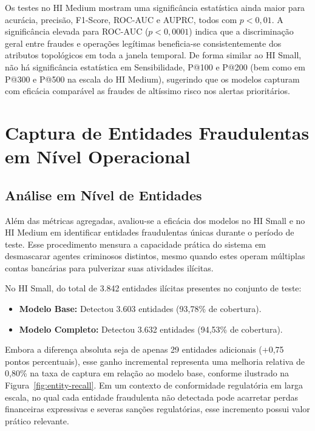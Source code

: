 \documentclass[titlepage,a4paper,oneside,onecolumn,12pt]{report}
\begin{document}
Os testes no HI Medium mostram uma significância estatística ainda maior para acurácia, precisão, F1-Score, ROC-AUC e AUPRC, todos com $p < 0{,}01$. A significância elevada para ROC-AUC ($p < 0{,}0001$) indica que a discriminação geral entre fraudes e operações legítimas beneficia-se consistentemente dos atributos topológicos em toda a janela temporal. De forma similar ao HI Small, não há significância estatística em Sensibilidade, P@100 e P@200 (bem como em P@300 e P@500 na escala do HI Medium), sugerindo que os modelos capturam com eficácia comparável as fraudes de altíssimo risco nos alertas prioritários.

\section{Captura de Entidades Fraudulentas em Nível Operacional}

\subsection{Análise em Nível de Entidades}

Além das métricas agregadas, avaliou-se a eficácia dos modelos no HI Small e no HI Medium em identificar entidades fraudulentas únicas durante o período de teste. Esse procedimento mensura a capacidade prática do sistema em desmascarar agentes criminosos distintos, mesmo quando estes operam múltiplas contas bancárias para pulverizar suas atividades ilícitas. 

No HI Small, do total de 3.842 entidades ilícitas presentes no conjunto de teste:

\begin{itemize}
    \item \textbf{Modelo Base:} Detectou 3.603 entidades (93,78\% de cobertura).
    \item \textbf{Modelo Completo:} Detectou 3.632 entidades (94,53\% de cobertura).
\end{itemize}

Embora a diferença absoluta seja de apenas 29 entidades adicionais (+0,75 pontos percentuais), esse ganho incremental representa uma melhoria relativa de 0,80\% na taxa de captura em relação ao modelo base, conforme ilustrado na Figura~\ref{fig:entity-recall}. Em um contexto de conformidade regulatória em larga escala, no qual cada entidade fraudulenta não detectada pode acarretar perdas financeiras expressivas e severas sanções regulatórias, esse incremento possui valor prático relevante.
\end{document}
